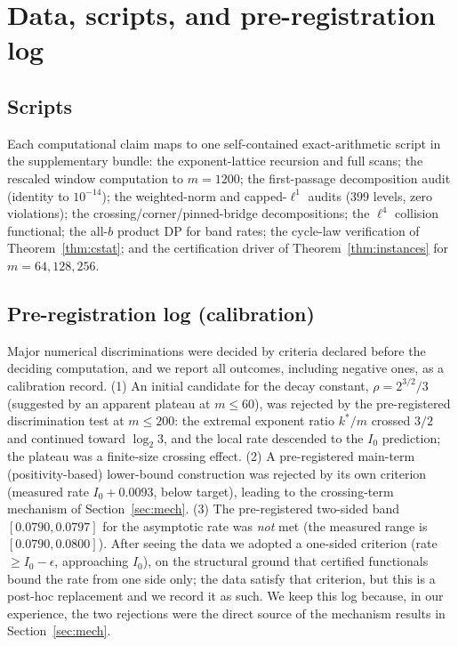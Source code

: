 \documentclass[11pt]{article}
\theoremstyle{definition}
\begin{document}
\appendix

\section{Data, scripts, and pre-registration log}\label{app:data}

\subsection*{Scripts} Each computational claim maps to one
self-contained exact-arithmetic script in the supplementary bundle:
the exponent-lattice recursion and full scans; the rescaled window
computation to $m=1200$; the first-passage decomposition audit
(identity to $10^{-14}$); the weighted-norm and capped-$\ell^1$ audits
($399$ levels, zero violations); the crossing/corner/pinned-bridge
decompositions; the $\ell^4$ collision functional; the all-$b$ product
DP for band rates; the cycle-law verification of
Theorem~\ref{thm:cstat}; and the certification driver of
Theorem~\ref{thm:instances} for $m=64,128,256$.

\subsection*{Pre-registration log (calibration)} Major numerical
discriminations were decided by criteria declared before the deciding
computation, and we report all outcomes, including negative ones, as a
calibration record. (1) An initial candidate for the decay constant,
$\rho=2^{3/2}/3$ (suggested by an apparent plateau at $m\le 60$), was
rejected by the pre-registered discrimination test at $m\le 200$: the
extremal exponent ratio $k^*/m$ crossed $3/2$ and continued toward
$\log_2 3$, and the local rate descended to the $I_0$ prediction; the
plateau was a finite-size crossing effect. (2) A pre-registered
main-term (positivity-based) lower-bound construction was rejected by
its own criterion (measured rate $I_0+0.0093$, below target), leading
to the crossing-term mechanism of Section~\ref{sec:mech}. (3) The
pre-registered two-sided band $[0.0790,0.0797]$ for the asymptotic rate
was \emph{not} met (the measured range is $[0.0790,0.0800]$). After
seeing the data we adopted a one-sided criterion (rate $\ge I_0-\epsilon$,
approaching $I_0$), on the structural ground that certified functionals
bound the rate from one side only; the data satisfy that criterion, but
this is a post-hoc replacement and we record it as such. We keep this log because, in our experience, the two
rejections were the direct source of the mechanism results in
Section~\ref{sec:mech}.
\end{document}
